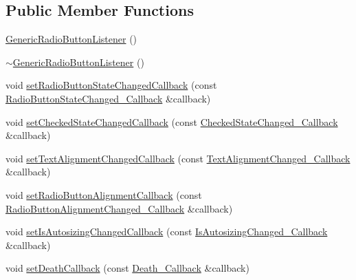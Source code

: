 \subsection*{Public Member Functions}
\begin{DoxyCompactItemize}
\item 
\mbox{\hyperlink{classec_1_1_generic_radio_button_listener_a8774f775095744c1ed25d81dc1332395}{Generic\+Radio\+Button\+Listener}} ()
\item 
\mbox{\hyperlink{classec_1_1_generic_radio_button_listener_aec9a1695248927929f3338e9e433514d}{$\sim$\+Generic\+Radio\+Button\+Listener}} ()
\item 
void \mbox{\hyperlink{classec_1_1_generic_radio_button_listener_a46d33dd2ab5a18b479da3935c5a6d896}{set\+Radio\+Button\+State\+Changed\+Callback}} (const \mbox{\hyperlink{classec_1_1_generic_radio_button_listener_ab56b850f44f5d460dff301eef04d430b}{Radio\+Button\+State\+Changed\+\_\+\+Callback}} \&callback)
\item 
void \mbox{\hyperlink{classec_1_1_generic_radio_button_listener_af8f3df6e03ab0cc97ad27bbf8c1ead9a}{set\+Checked\+State\+Changed\+Callback}} (const \mbox{\hyperlink{classec_1_1_generic_radio_button_listener_aa2ce6fc7dec8cfb263608c59f6eb338f}{Checked\+State\+Changed\+\_\+\+Callback}} \&callback)
\item 
void \mbox{\hyperlink{classec_1_1_generic_radio_button_listener_a90c75e6db58773ab30347174e40d33ae}{set\+Text\+Alignment\+Changed\+Callback}} (const \mbox{\hyperlink{classec_1_1_generic_radio_button_listener_a3e8ead6a08363f220625d2f856b9213d}{Text\+Alignment\+Changed\+\_\+\+Callback}} \&callback)
\item 
void \mbox{\hyperlink{classec_1_1_generic_radio_button_listener_abefce61c2b790e4947370d4b2fd2b381}{set\+Radio\+Button\+Alignment\+Callback}} (const \mbox{\hyperlink{classec_1_1_generic_radio_button_listener_a5abb2fecaaf86a6a0b5c0ce355cdbcb6}{Radio\+Button\+Alignment\+Changed\+\_\+\+Callback}} \&callback)
\item 
void \mbox{\hyperlink{classec_1_1_generic_radio_button_listener_a3ea25db33823e0f051be69ab1552bfed}{set\+Is\+Autosizing\+Changed\+Callback}} (const \mbox{\hyperlink{classec_1_1_generic_radio_button_listener_adc874051d63443a9eb1ab194a1730306}{Is\+Autosizing\+Changed\+\_\+\+Callback}} \&callback)
\item 
void \mbox{\hyperlink{classec_1_1_generic_radio_button_listener_a3af49983e6fb684a7e5a6c8fa8bd14ad}{set\+Death\+Callback}} (const \mbox{\hyperlink{classec_1_1_generic_radio_button_listener_aa760bb857feacd099dadc0a1b182c40f}{Death\+\_\+\+Callback}} \&callback)

\end{DoxyCompactItemize}
